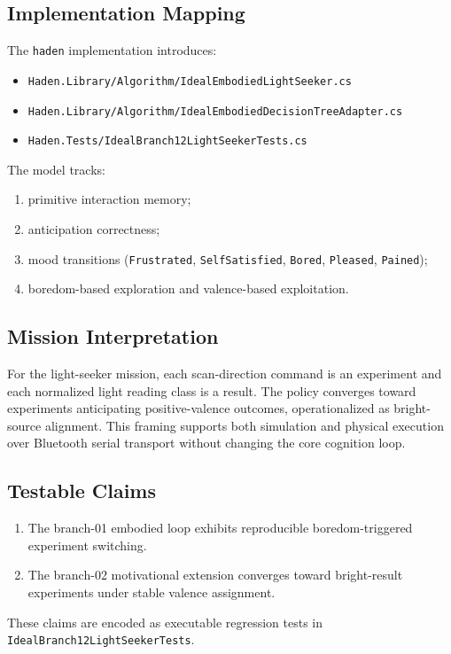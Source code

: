 \subsection{Implementation Mapping}
The \texttt{haden} implementation introduces:
\begin{itemize}
\item \texttt{Haden.Library/Algorithm/IdealEmbodiedLightSeeker.cs}
\item \texttt{Haden.Library/Algorithm/IdealEmbodiedDecisionTreeAdapter.cs}
\item \texttt{Haden.Tests/IdealBranch12LightSeekerTests.cs}
\end{itemize}

The model tracks:
\begin{enumerate}
\item primitive interaction memory;
\item anticipation correctness;
\item mood transitions (\texttt{Frustrated}, \texttt{SelfSatisfied}, \texttt{Bored}, \texttt{Pleased}, \texttt{Pained});
\item boredom-based exploration and valence-based exploitation.
\end{enumerate}

\subsection{Mission Interpretation}
For the light-seeker mission, each scan-direction command is an experiment and each normalized light reading class is a result.
The policy converges toward experiments anticipating positive-valence outcomes, operationalized as bright-source alignment.
This framing supports both simulation and physical execution over Bluetooth serial transport without changing the core cognition loop.

\subsection{Testable Claims}
\begin{enumerate}
\item The branch-01 embodied loop exhibits reproducible boredom-triggered experiment switching.
\item The branch-02 motivational extension converges toward bright-result experiments under stable valence assignment.
\end{enumerate}

These claims are encoded as executable regression tests in \texttt{IdealBranch12LightSeekerTests}.


